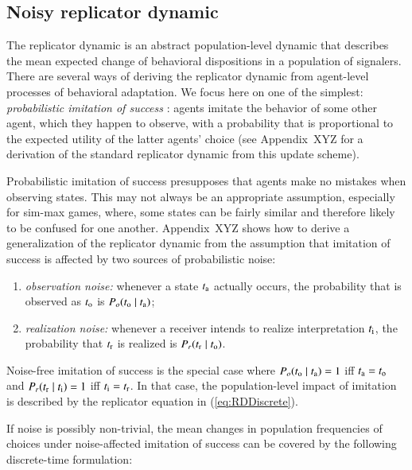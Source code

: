 \documentclass[fleqn,reqno,10pt]{article}
\begin{document}
\subsection{Noisy replicator dynamic}
\label{sec:noisy-repl-dynam}

The replicator dynamic is an abstract population-level dynamic that describes the mean expected
change of behavioral dispositions in a population of signalers. There are several ways of
deriving the replicator dynamic from agent-level processes of behavioral adaptation. We focus
here on one of the simplest: \emph{probabilistic imitation of success}
\citep[see][]{Sandholm2010:Population-Game}: agents imitate the behavior of some other agent,
which they happen to observe, with a probability that is proportional to the expected utility
of the latter agents' choice (see Appendix~XYZ for a derivation of the standard replicator
dynamic from this update scheme).

Probabilistic imitation of success presupposes that agents make no mistakes when observing
states. This may not always be an appropriate assumption, especially for sim-max games, where,
some states can be fairly similar and therefore likely to be confused for one
another. Appendix~XYZ shows how to derive a generalization of the replicator dynamic from the
assumption that imitation of success is affected by two sources of probabilistic noise:

\begin{enumerate}
\item \emph{observation noise:} whenever a state $t_{\mathrm{a}}$ actually occurs, the
  probability that is observed as $t_{\mathrm{o}}$ is $P_o(t_{\mathrm{o}} \mid t_{\mathrm{a}})$;
\item \emph{realization noise:} whenever a receiver intends to realize interpretation
  $t_{\mathrm{i}}$, the probability that $t_{\mathrm{r}}$ is realized is $P_r(t_{\mathrm{r}} \mid t_{\mathrm{o}})$.
\end{enumerate}

\noindent Noise-free imitation of success is the special case where $P_o(t_{\mathrm{o}} \mid
t_{\mathrm{a}}) = 1$ iff $t_{\mathrm{a}} = t_{\mathrm{o}}$ and $P_r(t_{\mathrm{r}} \mid
t_{\mathrm{i}}) = 1$ iff $t_{\mathrm{i}} = t_{\mathrm{r}}$. In that case, the population-level impact of
imitation is described by the replicator equation in (\ref{eq:RDDiscrete}). 


If noise is possibly non-trivial, the mean changes in population frequencies of choices
under noise-affected imitation of success can be covered by the following discrete-time
formulation:
\end{document}
